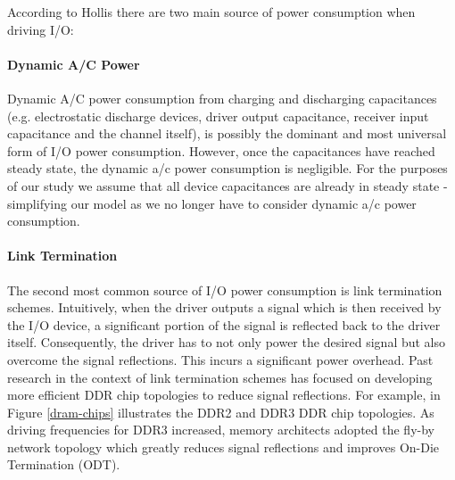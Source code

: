 According to Hollis \cite{hollis} there are two main source of power
consumption when driving I/O:

\paragraph{Dynamic A/C Power} Dynamic A/C power consumption from charging and
discharging capacitances (e.g. electrostatic discharge devices, driver output
capacitance, receiver input capacitance and the channel itself), is possibly
the dominant and most universal form of I/O power consumption. However, once
the capacitances have reached steady state, the dynamic a/c power consumption
is negligible. For the purposes of our study we assume that all device
capacitances are already in steady state - simplifying our model as we no
longer have to consider dynamic a/c power consumption.

\paragraph{Link Termination} The second most common source of I/O power
consumption is link termination schemes. Intuitively, when the driver
outputs a signal which is then received by the I/O device, a significant
portion of the signal is reflected back to the driver itself. Consequently, the
driver has to not only power the desired signal but also overcome the signal
reflections.  This incurs a significant power overhead. Past research in the
context of link termination schemes has focused on developing more efficient
DDR chip topologies to reduce signal reflections. For example, in Figure
\ref{dram-chips} illustrates the DDR2 and DDR3 DDR chip topologies. As driving
frequencies for DDR3 increased, memory architects adopted the fly-by network
topology which greatly reduces signal reflections and improves On-Die
Termination (ODT).

